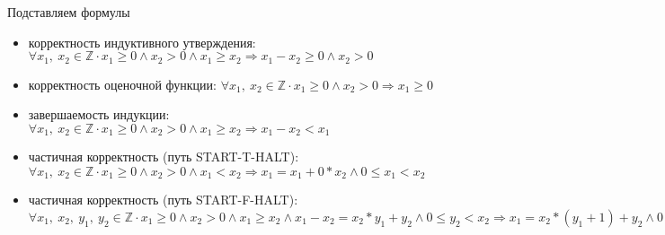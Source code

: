 \documentclass[hyperref={unicode=true}]{beamer}
\begin{document}
    \begin{frame}{Подставляем формулы}
    \begin{itemize}
    \item корректность индуктивного утверждения:
            $\forall x_1,~x_2 \in \mathbb{Z} \cdot
            x_1 \geq 0 \land x_2 > 0 \land x_1 \geq x_2
            \Rightarrow
            x_1 - x_2 \geq 0 \land x_2 > 0$
    \item корректность оценочной функции:
            $\forall x_1,~x_2 \in \mathbb{Z} \cdot
            x_1 \geq 0 \land x_2 > 0
            \Rightarrow
            x_1 \geq 0$
    \item завершаемость индукции:
            $\forall x_1,~x_2 \in \mathbb{Z} \cdot
            x_1 \geq 0 \land x_2 > 0 \land x_1 \geq x_2
            \Rightarrow
            x_1 - x_2 < x_1$
    \item частичная корректность (путь START-T-HALT):
            $\forall x_1,~x_2 \in \mathbb{Z} \cdot
            x_1 \geq 0 \land x_2 > 0 \land x_1 < x_2
            \Rightarrow
            x_1 = x_1 + 0 * x_2 \land 0 \leq x_1 < x_2$
    \item частичная корректность (путь START-F-HALT):
            $\forall x_1,~x_2,~y_1,~y_2 \in \mathbb{Z} \cdot
            x_1 \geq 0 \land x_2 > 0 \land x_1 \geq x_2 \land
            x_1 - x_2 = x_2 * y_1 + y_2 \land 0 \leq y_2 < x_2
            \Rightarrow
            x_1 = x_2 * (y_1 + 1) + y_2 \land 0 \leq y_2 < x_2$
    \end{itemize}
    \end{frame}
\end{document}
